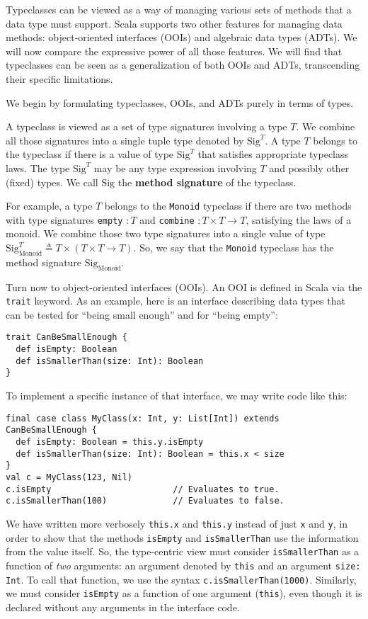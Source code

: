 Typeclasses can be viewed as a way of managing various sets of methods
that a data type must support. Scala supports two other features for
managing data methods: object-oriented interfaces
(OOIs) and algebraic data types (ADTs).
We will now compare the expressive power of all those features. We
will find that typeclasses can be seen as a generalization of both
OOIs and ADTs, transcending their specific limitations.

We begin by formulating typeclasses, OOIs, and ADTs purely in terms
of types. 

A typeclass is viewed as a set of type signatures involving a type
$T$. We combine all those signatures into a single tuple type denoted
by $\text{Sig}^{T}$. A type $T$ belongs to the typeclass if there
is a value of type $\text{Sig}^{T}$ that satisfies appropriate typeclass
laws. The type $\text{Sig}^{T}$ may be any type expression involving
$T$ and possibly other (fixed) types. We call $\text{Sig}$ the \textbf{method
signature} of the typeclass.

For example, a type $T$ belongs to the \lstinline!Monoid! typeclass
if there are two methods with type signatures \lstinline!empty! $:T$
and \lstinline!combine! $:T\times T\rightarrow T$, satisfying the
laws of a monoid. We combine those two type signatures into a single
value of type $\text{Sig}_{\text{Monoid}}^{T}\triangleq T\times(T\times T\rightarrow T)$.
So, we say that the \lstinline!Monoid! typeclass has the method signature
$\text{Sig}_{\text{Monoid}}$.

Turn now to object-oriented interfaces (OOIs). An OOI is defined in
Scala via the \lstinline!trait! keyword. As an example, here is an
interface describing data types that can be tested for \textsf{``}being small
enough\textsf{''} and for \textsf{``}being empty\textsf{''}:
\begin{lstlisting}
trait CanBeSmallEnough {
  def isEmpty: Boolean
  def isSmallerThan(size: Int): Boolean
}
\end{lstlisting}
To implement a specific instance of that interface, we may write code
like this:
\begin{lstlisting}
final case class MyClass(x: Int, y: List[Int]) extends CanBeSmallEnough {
  def isEmpty: Boolean = this.y.isEmpty
  def isSmallerThan(size: Int): Boolean = this.x < size
}
val c = MyClass(123, Nil)
c.isEmpty                        // Evaluates to true.
c.isSmallerThan(100)             // Evaluates to false.
\end{lstlisting}
We have written more verbosely \lstinline!this.x! and \lstinline!this.y!
instead of just \lstinline!x! and \lstinline!y!, in order to show
that the methods \lstinline!isEmpty! and \lstinline!isSmallerThan!
use the information from the value itself. So, the type-centric view
must consider \lstinline!isSmallerThan! as a function of \emph{two}
arguments: an argument denoted by \lstinline!this! and an argument
\lstinline!size: Int!. To call that function, we use the syntax \lstinline!c.isSmallerThan(1000)!.
Similarly, we must consider \lstinline!isEmpty! as a function of
one argument (\lstinline!this!), even though it is declared without
any arguments in the interface code.

